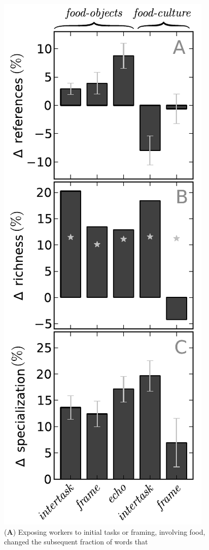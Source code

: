 \documentclass[12pt]{article}
\begin{document}
\begin{figure}
	\centering
	\includegraphics[scale=0.92]{figs/vocab_specificity.pdf}
	\caption{
		(\textbf{A}) Exposing workers to initial tasks or framing, 
		involving food, changed the subsequent fraction of words that 
}
\end{figure}
\end{document}
